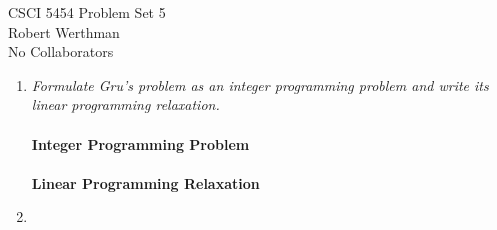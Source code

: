 \documentclass[12pt]{article}
\begin{document}
CSCI 5454 \hfill Problem Set 5\\
Robert Werthman\\
No Collaborators

\hrulefill

\begin{enumerate}
  
  \item \textit{Formulate Gru's problem as an integer programming problem and
  write its linear programming relaxation.}\\
  \\
  \textbf{Integer Programming Problem}\\
  \\
  \textbf{Linear Programming Relaxation}\\
  
  \newpage
  \item \textit{}
\end{enumerate}
\end{document}
